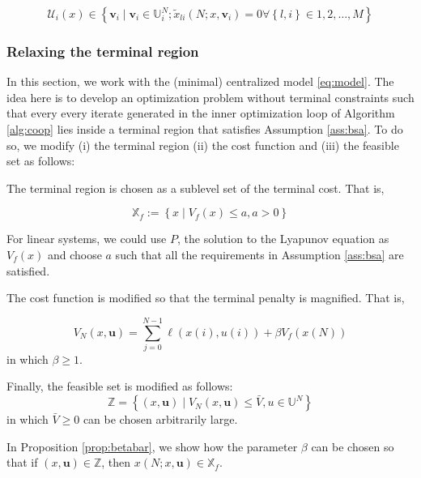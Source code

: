 \documentclass[10pt]{article}
\newcommand{\bu}{\mathbf{u}}
\newcommand{\set}[1]{\left\lbrace #1 \right\rbrace}
\theoremstyle{definition}
\begin{document}
\[ \mathcal{U}_i(x) \in \set{ \mathbf{v}_i \mid \mathbf{v}_i \in
  \mathbb{U}_i^N; \tilde{x}_{li}(N;x,\mathbf{v}_i) = 0 \forall \set{l,i} \in
  1,2,\ldots,M}
\]

\subsubsection{Relaxing the terminal region}
\label{sec:relaxation}
In this section, we work with the (minimal) centralized model
\eqref{eq:model}. The idea here is to develop an optimization problem
without terminal constraints such that every every iterate generated
in the inner optimization loop of Algorithm \ref{alg:coop} lies inside
a terminal region that satisfies Assumption \ref{ass:bsa}. To do so,
we modify (i) the terminal region (ii) the cost function and (iii) the
feasible set as follows:

The terminal region is chosen as a sublevel set of the terminal
cost. That is,

\begin{equation}
\label{eq:Xfa}
\mathbb{X}_f := \set{x \mid V_f(x) \leq a, a > 0}
\end{equation}

For linear systems, we could use $P$, the solution to the Lyapunov
equation as $V_f(x)$ and choose $a$ such that all the requirements in
Assumption \ref{ass:bsa} are satisfied.

The cost function is modified so that the terminal penalty is
magnified. That is,

\begin{equation}
\label{eq:VNbeta}
V_N(x,\bu) = \sum_{j=0}^{N-1} \ell(x(i),u(i)) + \beta V_f(x(N))
\end{equation}
in which $\beta \geq 1$.

Finally, the feasible set is modified as follows:
\begin{equation}
\label{eq:ZNbeta}
\mathbb{Z} = \set{ (x,\bu) \mid V_N(x,\bu) \leq \bar{V}, u \in
  \mathbb{U}^N}
\end{equation}
in which $\bar{V} \geq 0$  can be chosen arbitrarily large.

In Proposition \ref{prop:betabar}, we show how the parameter $\beta$
can be chosen so that if $(x,\bu) \in \mathbb{Z}$, then
$x(N;x,\bu) \in \mathbb{X}_f$. 
\end{document}
